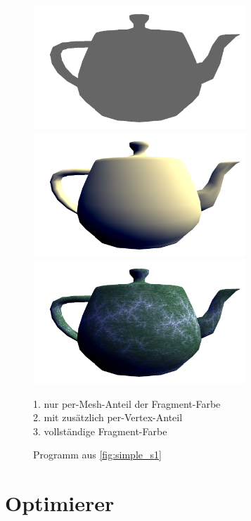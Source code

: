 \documentclass[twoside,a4paper,fleqn,12pt]{book}
\begin{document}
\begin{figure}[h]
  \centering
  \includegraphics[width=8cm]{simple_s1_mesh}\\
  \includegraphics[width=8cm]{simple_s1_vert}\\
  \includegraphics[width=8cm]{simple_s1_frag}
  \caption{Programm aus \ref{fig:simple_s1}}
  \small 1. nur per-Mesh-Anteil der Fragment-Farbe\\
  2. mit zusätzlich per-Vertex-Anteil\\
  3. vollständige Fragment-Farbe\\
  \label{fig:simple_s1_images}
\end{figure}

\clearpage
\section{Optimierer}
\end{document}
